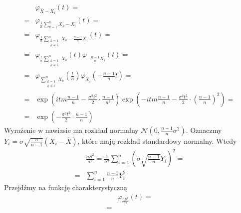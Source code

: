 \begin{align*}
&\varphi_{\overline X-X_i}(t)
=\\=&
\varphi_{\frac{1}{n}\sum_{k=1}^{n}X_k-X_i}(t)
=\\=&
\varphi_{\frac{1}{n}\sum_{\substack{k=1\\k\neq i}}^{n}X_k-\frac{n-1}{n}X_i}(t)
=\\=&
\varphi_{\frac{1}{n}\sum_{\substack{k=1\\k\neq i}}^{n}X_k}(t)\varphi_{-\frac{n-1}{n}X_i}(t)
=\\=&
\varphi_{\sum_{\substack{k=1\\k\neq i}}^{n}X_k}\left(\tfrac{t}{n}\right)
\varphi_{X_i}\left(-\frac{n-1}{n}t\right)
=\\=&
\exp \left(itm\frac{n-1}{n} -\frac{\sigma ^{2}t^{2}}{2}\cdot \frac{n-1}{n^2}\right)
\exp\left(-itm\frac{n-1}{n}-\frac{\sigma^2t^2}{2}\cdot \left(\frac{n-1}{n}\right)^2\right)
=\\=&
\exp \left(-\frac{\sigma ^2t^2}{2}\cdot\frac{n-1}{n}\right)
\end{align*}
Wyrażenie w nawiasie ma rozkład normalny $ \mathcal N(0,\frac{n-1}{n}\sigma ^2) $. Oznaczmy\\ $ Y_i=\sigma\sqrt{\frac{n}{n-1}}\left(X_i-\overline X\right) $, które mają rozkład standardowy normalny. Wtedy
\begin{align*}
&\frac{nS^2}{\sigma^2}=
\frac{1}{\sigma ^2}\sum_{i=1}^{n}\left(\sigma\sqrt{\frac{n-1}{n}}Y_i\right)^2
=\\=&
\sum_{i=1}^{n}\frac{n-1}{n}Y_i^2
\end{align*}
Przejdźmy na funkcję charakterystyczną
\begin{align*}
&\varphi_{\frac{nS^2}{\sigma^2}}(t)
=\\=&
\end{align*}



